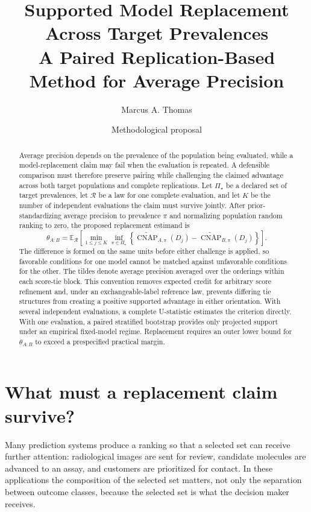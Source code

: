 \documentclass[11pt]{article}
\title{Supported Model Replacement Across Target Prevalences\\
\large A Paired Replication-Based Method for Average Precision}
\author{Marcus A. Thomas}
\date{Methodological proposal}
\newcommand{\CNAP}{\operatorname{CNAP}}
\newcommand{\Regime}{\mathcal{R}}
\newcommand{\PSet}{\Pi_\star}
\newcommand{\E}{\mathbb{E}}
\theoremstyle{remark}
\begin{document}
\maketitle

\begin{abstract}
Average precision depends on the prevalence of the population being evaluated, while a model-replacement claim may fail when the evaluation is repeated. A defensible comparison must therefore preserve pairing while challenging the claimed advantage across both target populations and complete replications. Let $\PSet$ be a declared set of target prevalences, let $\Regime$ be a law for one complete evaluation, and let $K$ be the number of independent evaluations the claim must survive jointly. After prior-standardizing average precision to prevalence $\pi$ and normalizing population random ranking to zero, the proposed replacement estimand is
\[
\theta_{A:B}
=
\E_{\Regime}\left[
\min_{1\leq j\leq K}
\inf_{\pi\in\PSet}
\left\{
\widetilde{\CNAP}_{A,\pi}(D_j)
-
\widetilde{\CNAP}_{B,\pi}(D_j)
\right\}
\right].
\]
The difference is formed on the same units before either challenge is applied, so favorable conditions for one model cannot be matched against unfavorable conditions for the other. The tildes denote average precision averaged over the orderings within each score-tie block. This convention removes expected credit for arbitrary score refinement and, under an exchangeable-label reference law, prevents differing tie structures from creating a positive supported advantage in either orientation. With several independent evaluations, a complete U-statistic estimates the criterion directly. With one evaluation, a paired stratified bootstrap provides only projected support under an empirical fixed-model regime. Replacement requires an outer lower bound for $\theta_{A:B}$ to exceed a prespecified practical margin.
\end{abstract}

\section{What must a replacement claim survive?}
\label{sec:introduction}

Many prediction systems produce a ranking so that a selected set can receive further attention: radiological images are sent for review, candidate molecules are advanced to an assay, and customers are prioritized for contact. In these applications the composition of the selected set matters, not only the separation between outcome classes, because the selected set is what the decision maker receives.
\end{document}
